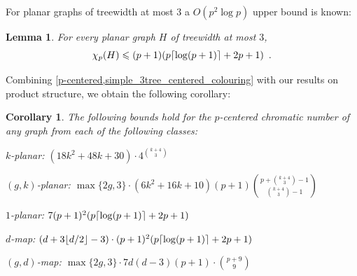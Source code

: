 \documentclass{patmorin}
\theoremstyle{plain}
\newtheorem{lem}[thm]{Lemma}
\newtheorem{cor}[thm]{Corollary}
\theoremstyle{definition}
\newcommand{\note}[2]{\noindent{\color{red}[#1:~#2]}}
\DeclarePairedDelimiter{\ceil}{\lceil}{\rceil}
\DeclarePairedDelimiter{\floor}{\lfloor}{\rfloor}
\renewcommand{\ge}{\geqslant}
\renewcommand{\le}{\leqslant}
\begin{document}
%

For planar graphs of treewidth at most $3$ a $O(p^2\log p)$ upper bound is known:

\begin{lem}\cite{DFMS21}\label{simple_3tree_centered_colouring}
  For every planar graph $H$ of treewidth at most $3$,
  \[
    \chi_p(H)\le (p+1)(p\ceil{\log(p+1)}+2p+1) \enspace .
  \]
\end{lem}

Combining \cref{p-centered,simple_3tree_centered_colouring} with our results on product structure, we obtain the following corollary:

\begin{cor}\label{p_centered_cor}
  The following bounds hold for the $p$-centered chromatic number of any graph from each of the following classes:
  \begin{compactitem}
    \item $k$-planar: $(18k^2+48k+30)\cdot 4^{\binom{k+4}{3}}$
    \item $(g,k)$-planar: $\max\{2g,3\}\cdot(6k^2+16k+10)(p+1)\binom{p+\binom{k+4}{3}-1}{\binom{k+4}{3}-1}$
    \item $1$-planar: $7(p+1)^2(p\ceil{\log(p+1)}+2p+1)$
    \item $d$-map: $(d+3\floor{d/2}-3)\cdot (p+1)^2(p\ceil{\log(p+1)}+2p+1)$
    \item $(g,d)$-map: $\max\{2g,3\}\cdot 7d(d-3)(p+1)\cdot \binom{p+9}{9}$
  \end{compactitem}
\end{cor}
\end{document}
